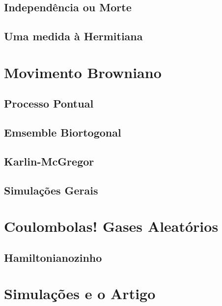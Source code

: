 \documentclass[11pt,oneside,a4paper]{report}
\begin{document}
\section{Independência ou Morte}


\section{Uma medida à Hermitiana}


\chapter{Movimento Browniano}


\section{Processo Pontual}


\section{Emsemble Biortogonal}


\section{Karlin-McGregor}


\section{Simulações Gerais}


\chapter{Coulombolas! Gases Aleatórios}


\section{Hamiltonianozinho}


\chapter{Simulações e o Artigo}

\end{document}
